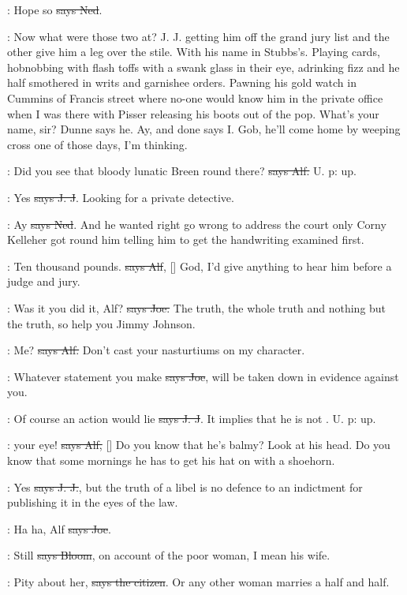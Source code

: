 \lambert:
Hope so \sout{says Ned}.

\Nq:
Now what were those two at? J. J. getting him off the grand jury list
and the other give him a leg over the stile. With his name in Stubbs's.
Playing cards, hobnobbing with flash toffs with a swank glass in their
eye, adrinking fizz and he half smothered in writs and garnishee orders.
Pawning his gold watch in Cummins of Francis street where no-one would
know him in the private office when I was there with Pisser releasing his
boots out of the pop. What's your name, sir? Dunne says he. Ay, and done
says I. Gob, he'll come home by weeping cross one of those days, I'm
thinking.

\bergan:
Did you see that bloody lunatic Breen round there?
 \sout{says Alf.} U. p: up.

\jjom:
Yes \sout{says J. J}.
Looking for a private detective.

\lambert:
Ay \sout{says Ned}.
And he wanted right go wrong to address the court only
Corny Kelleher got round him telling him to get the handwriting examined
first.

\bergan:
Ten thousand pounds. \sout{says Alf},
[]
God, I'd give anything to hear
him before a judge and jury.

\joe:
Was it you did it, Alf? \sout{says Joe.}
The truth, the whole truth and nothing
but the truth, so help you Jimmy Johnson.

\bergan:
Me? \sout{says Alf.}
Don't cast your nasturtiums on my character.

\joe:
Whatever statement you make \sout{says Joe},
will be taken down in evidence
against you.

\jjom:
Of course an action would lie \sout{says J. J}.
It implies that he is not
. U. p: up.

\bergan:
 your eye!
\sout{says Alf,} []
Do you know that he's balmy?
Look at his head. Do you know that some mornings he has to get his hat on
with a shoehorn.

\jjom:
Yes \sout{says J. J.},
but the truth of a libel is no defence to an indictment
for publishing it in the eyes of the law.

\joe:
Ha ha, Alf \sout{says Joe}.

\Bloom:
Still \sout{says Bloom}, on account of the poor woman,
I mean his wife.

\citizen:
Pity about her, \sout{says the citizen}.
Or any other woman marries a half and half.

